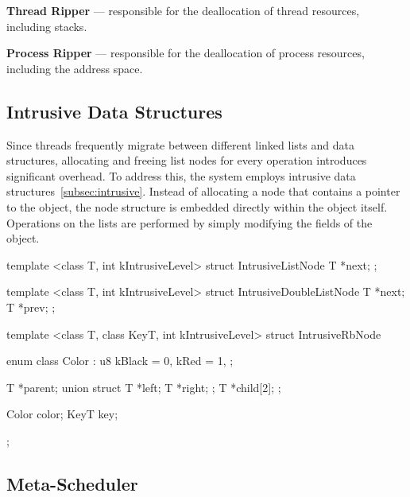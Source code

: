 \documentclass[a4paper,10pt,twoside]{report}
\theoremstyle{definition}
\begin{document}
\textbf{Thread Ripper} --- responsible for the deallocation of thread resources, including stacks.

\textbf{Process Ripper} --- responsible for the deallocation of process resources, including the address space.

\subsection{Intrusive Data Structures}

Since threads frequently migrate between different linked lists and data structures, allocating and freeing list nodes for every operation introduces significant overhead. To address this, the system employs intrusive data structures~\ref{subsec:intrusive}. Instead of allocating a node that contains a pointer to the object, the node structure is embedded directly within the object itself. Operations on the lists are performed by simply modifying the fields of the object.

\clearpage

\begin{cppcode}[caption={Intrusive Nodes}, label={lst:intrusiveNodes}]
template <class T, int kIntrusiveLevel>
struct IntrusiveListNode {
    T *next;
};

template <class T, int kIntrusiveLevel>
struct IntrusiveDoubleListNode {
    T *next;
    T *prev;
};

template <class T, class KeyT, int kIntrusiveLevel>
struct IntrusiveRbNode {
    enum class Color : u8 {
        kBlack = 0,
        kRed   = 1,
    };

    T *parent;
    union {
        struct {
            T *left;
            T *right;
        };
        T *child[2];
    };

    Color color;
    KeyT key;
};
\end{cppcode}

\subsection{Meta-Scheduler}
\end{document}
